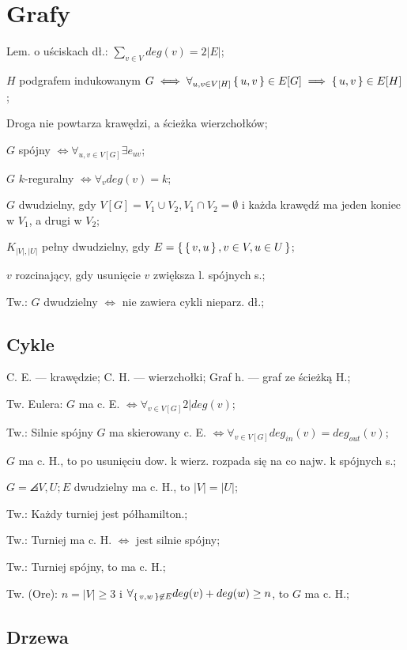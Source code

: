 \section{Grafy}

Lem. o uściskach dł.: $\sum_{v\in V} deg(v) = 2|E|$;

$H$ podgrafem indukowanym $G
  \iff \forall_{u,v \in V[H]} \set{u, v} \in E[G] \implies \set{u, v}\in E[H]$;

Droga nie powtarza krawędzi, a ścieżka wierzchołków;

$G$ spójny $\iff \forall_{u,v\in V[G]} \exists e_{uv}$;

$G$ $k$-reguralny $\iff \forall_v deg(v) = k$;

$G$ dwudzielny, gdy $V[G] = V_1 \cup V_2, V_1 \cap V_2 = \emptyset$ i każda
  krawędź ma jeden koniec w $V_1$, a drugi w $V_2$;

$K_{|V|, |U|}$ pełny dwudzielny, gdy $E=\set{\set{v, u}, v \in V, u \in U}$;

$v$ rozcinający, gdy usunięcie $v$ zwiększa l. spójnych s.;

Tw.: $G$ dwudzielny $\iff$ nie zawiera cykli nieparz. dł.;

\subsection{Cykle}

C. E. --- krawędzie; C. H. --- wierzchołki; Graf h. --- graf ze ścieżką H.;

Tw. Eulera: $G$ ma c. E. $\iff \forall_{v \in V[G]} 2|deg(v)$;

Tw.: Silnie spójny $G$ ma skierowany c. E.
  $\iff \forall_{v \in V[G]} deg_{in}(v) = deg_{out}(v)$;

$G$ ma c. H., to po usunięciu dow. k wierz. rozpada się na co najw.
  k spójnych s.;

$G = \angles{V, U; E}$ dwudzielny ma c. H., to $|V|=|U|$;

Tw.: Każdy turniej jest półhamilton.;

Tw.: Turniej ma c. H. $\iff$ jest silnie spójny;

Tw.: Turniej spójny, to ma c. H.;

Tw. (Ore): $n=|V|\geq 3$ i
  $\forall_{\set{v, w} \not\in E} deg(v) + deg(w) \geq n$, to $G$ ma c. H.;

\subsection{Drzewa}

